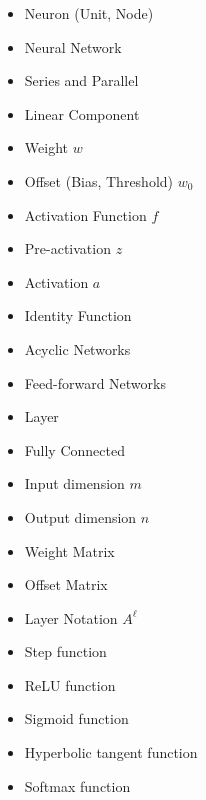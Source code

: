     \begin{itemize}
        \item Neuron (Unit, Node)
        \item Neural Network
        \item Series and Parallel
        \item Linear Component
        \item Weight $w$
        \item Offset (Bias, Threshold) $w_0$
        \item Activation Function $f$
        \item Pre-activation $z$
        \item Activation $a$
        \item Identity Function
        \item Acyclic Networks
        \item Feed-forward Networks
        \item Layer
        \item Fully Connected
        \item Input dimension $m$
        \item Output dimension $n$
        \item Weight Matrix
        \item Offset Matrix
        \item Layer Notation $A^\ell$
        \item Step function
        \item ReLU function
        \item Sigmoid function
        \item Hyperbolic tangent function
        \item Softmax function
    \end{itemize}
    
    
